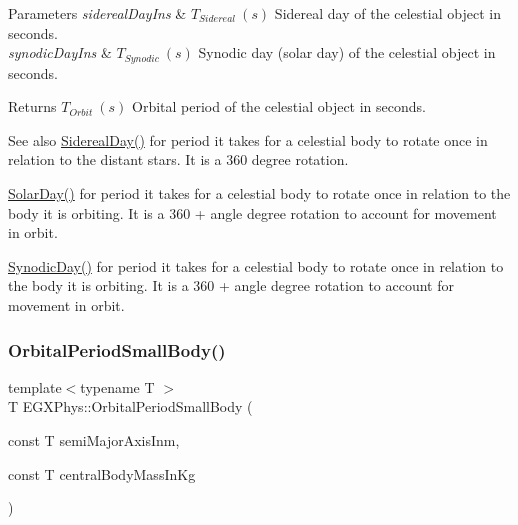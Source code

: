 \begin{DoxyParams}{Parameters}
{\em sidereal\+Day\+Ins} & $ T_{Sidereal}\ (s)$ Sidereal day of the celestial object in seconds. \\
\hline
{\em synodic\+Day\+Ins} & $ T_{Synodic}\ (s)$ Synodic day (solar day) of the celestial object in seconds. \\
\hline
\end{DoxyParams}
\begin{DoxyReturn}{Returns}
$ T_{Orbit}\ (s)$ Orbital period of the celestial object in seconds. 
\end{DoxyReturn}
\begin{DoxySeeAlso}{See also}
\mbox{\hyperlink{group___e_g_x_phys-_astrophysic-_sidereal_day_ga587900d5fc755228c1bb5121cd7965c6}{Sidereal\+Day()}} for period it takes for a celestial body to rotate once in relation to the distant stars. It is a 360 degree rotation. 

\mbox{\hyperlink{group___e_g_x_phys-_astrophysic-_solar_day_gae321e0dd0c031a57c45b15dc819635e0}{Solar\+Day()}} for period it takes for a celestial body to rotate once in relation to the body it is orbiting. It is a 360 + angle degree rotation to account for movement in orbit. 

\mbox{\hyperlink{group___e_g_x_phys-_astrophysic-_synodic_day_ga637140842bc008c87d90e65b551cbac7}{Synodic\+Day()}} for period it takes for a celestial body to rotate once in relation to the body it is orbiting. It is a 360 + angle degree rotation to account for movement in orbit. 
\end{DoxySeeAlso}
\mbox{\label{group___e_g_x_phys-_astrophysic-_orbital_period_ga5d4cc706d875fd82a83e566ade16546d}} 
\subsubsection{\texorpdfstring{Orbital\+Period\+Small\+Body()}{OrbitalPeriodSmallBody()}}
{\footnotesize\ttfamily template$<$typename T $>$ \\
T E\+G\+X\+Phys\+::\+Orbital\+Period\+Small\+Body (\begin{DoxyParamCaption}\item[{const T}]{semi\+Major\+Axis\+Inm,  }\item[{const T}]{central\+Body\+Mass\+In\+Kg }\end{DoxyParamCaption})}



